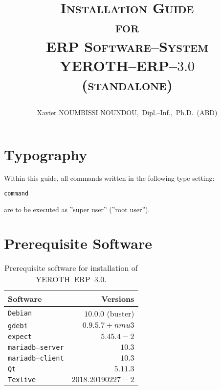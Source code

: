 \documentclass[a4paper, 10pt]{article}
\newcommand{\texlive}{\texttt{Texlive}\xspace}
\newcommand{\gdebi}{\texttt{gdebi}\xspace}
\newcommand{\expect}{\texttt{expect}\xspace}
\newcommand{\debian}{\texttt{Debian}\xspace}
\newcommand{\qt}{\texttt{Qt}\xspace}
\newcommand{\mariadbserver}{\texttt{mariadb--server}\xspace}
\newcommand{\mariadbclient}{\texttt{mariadb--client}\xspace}
\newcommand{\yerotherptroiszero}{\textcolor{yerenColorBlue}{\sc YEROTH--ERP--$3.0$}\xspace}
\newcommand{\yerotherp}{\textcolor{yerenColorBlue}{\sc YEROTH--ERP--$3.0$}\xspace}
\newcommand{\erp}{ERP Software--System\xspace}
\newcommand{\myfullacademicname}{Xavier NOUMBISSI NOUNDOU,~Dipl.--Inf.,~Ph.D.~(ABD)\xspace}
\newcommand{\rootcommand}[1]{
\begin{center}
\textcolor{purplish}{#1\xspace}
\end{center}}
\begin{document}

\title{
\vspace{-1.65em}
\textcolor{medgreen}{\textsc{Installation Guide\\
										for \\
									 \erp \\ \vspace{1em}
									 \yerotherp \\ 
									 \hspace{0.6em} \textcolor{yerenColorBlue}{(standalone)} }}
									 \author{\myfullacademicname}
}

\date{} 
\maketitle
\thispagestyle{fancy}

\vspace{-0.5em}

{}
\begingroup
\tableofcontents
\endgroup

\vspace{0.25cm}

\section{Typography}

Within this guide, all commands written
in the following type setting:
	\begin{alltt}
		\rootcommand{command}
	\end{alltt}
are to be executed as ''super user'' (''root user'').

\section{Prerequisite Software}

\begin{table}[!htbp]
\centering
\begin{tabular}{l|r}
\textbf{Software}	&
\textbf{Versions}	\\ \hline
\debian				&
$10.0.0$ (buster)	\\ \hline
\gdebi				&
$0.9.5.7+nmu3$		\\ \hline
\expect				&
$5.45.4-2$			\\ \hline
\mariadbserver		&
$10.3$				\\ \hline
\mariadbclient		&
$10.3$				\\ \hline
\qt					&
$5.11.3$			\\ \hline	
\texlive			&
$2018.20190227-2$	\\
\end{tabular}
\caption{Prerequisite software for installation of \yerotherptroiszero.}
\label{tab:prerequisite-software}
\end{table}
\end{document}
